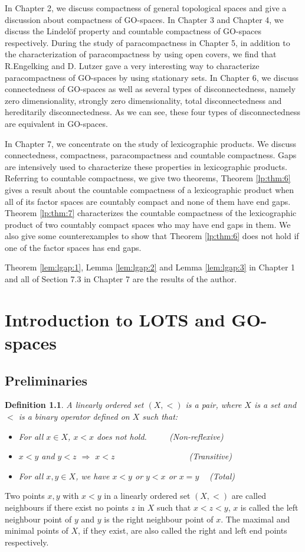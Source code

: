 \documentclass[12pt,oneside,english]{amsbook}
\numberwithin{equation}{section} %
\numberwithin{figure}{section} %
\theoremstyle{plain}
\numberwithin{section}{chapter}
\theoremstyle{plain}
\newtheorem{defn}[thm]{Definition}
\begin{document}
  In Chapter 2, we discuss compactness of general topological spaces and give a discussion about compactness of GO-spaces. In Chapter 3 and Chapter 4, we discuss the Lindel\"{o}f property and countable compactness of GO-spaces respectively. During the study of paracompactness in Chapter 5, in addition to the characterization of paracompactness by using open covers, we find that R.Engelking and D. Lutzer gave a very interesting way to characterize paracompactness of GO-spaces by using stationary sets. In Chapter 6, we discuss connectedness of GO-spaces as well as several types of disconnectedness, namely zero dimensionality, strongly zero dimensionality, total disconnectedness and hereditarily disconnectedness. As we can see, these four types of disconnectedness are equivalent in GO-spaces.

  In Chapter 7, we concentrate on the study of lexicographic products. We discuss connectedness, compactness, paracompactness and countable compactness. Gaps are intensively used to characterize these properties in lexicographic products. Referring to countable compactness, we give two theorems, Theorem \ref{lp:thm:6} gives a result about the countable compactness of a lexicographic product when all of its factor spaces are countably compact and none of them have end gaps. Theorem \ref{lp:thm:7} characterizes the countable compactness of the lexicographic product of two countably compact spaces who may have end gaps in them. We also give some counterexamples to show that Theorem \ref{lp:thm:6} does not hold if one of the factor spaces has end gaps.

  Theorem \ref{lem:lgap:1}, Lemma \ref{lem:lgap:2} and Lemma \ref{lem:lgap:3} in Chapter 1 and all of Section 7.3 in Chapter 7 are the results of the author.


\chapter{Introduction to LOTS and GO-spaces}
\section{Preliminaries}
\begin{defn}
  A linearly ordered set $(X, <)$ is a pair, where $X$ is a set and $<$ is a binary operator defined on $X$ such that:
  \begin{itemize}
  \item For all $x \in X$, $x < x$ does not hold.  $\qquad \! \!$ (Non-reflexive)
  \item $x < y$ and $y < z$ $\Rightarrow$ $x < z$ $\qquad \qquad \qquad \qquad \;$ (Transitive)
  \item For all $x, y \in X$, we have $x <y$ or $y <x$ or $x = y$ $  \;  \;$ (Total) 
  \end{itemize}
\end{defn}
Two points $x,y$ with $x < y$ in a linearly ordered set $(X,<)$ are called neighbours if there exist no points $z$ in $X$ such that $x < z < y$, $x$ is called the left neighbour point of $y$ and $y$ is the right neighbour point of $x$. The maximal and minimal points of $X$, if they exist, are also called the right and left end points respectively.
\end{document}
